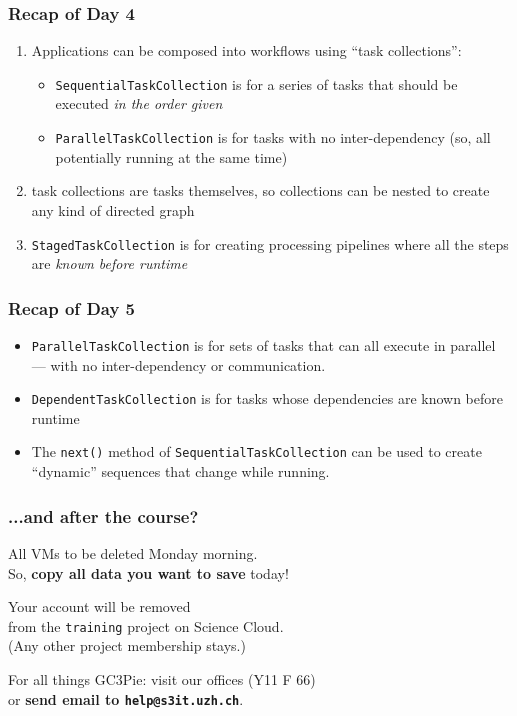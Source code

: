 \documentclass[english,serif,mathserif,xcolor=pdftex,dvipsnames,table]{beamer}
\begin{document}
\begin{frame}
  \frametitle{Recap of Day 4}

  \begin{enumerate}
  \item Applications can be composed into workflows using ``task collections'':
    \begin{itemize}
    \item \texttt{SequentialTaskCollection} is for a series of tasks that should
      be executed \emph{in the order given}
    \item \texttt{ParallelTaskCollection} is for tasks with no inter-dependency
      (so, all potentially running at the same time)
    \end{itemize}

  \item task collections are tasks themselves, so collections can be nested to
    create any kind of directed graph

  \item \texttt{StagedTaskCollection} is for creating processing pipelines where
    all the steps are \emph{known before runtime}
  \end{enumerate}
\end{frame}


\begin{frame}
  \frametitle{Recap of Day 5}

  \begin{itemize}
  \item \texttt{ParallelTaskCollection} is for sets of tasks that can all
    execute in parallel --- with no inter-dependency or communication.
  \item \texttt{DependentTaskCollection} is for tasks whose dependencies are
    known before runtime
  \item The \texttt{next()} method of \texttt{SequentialTaskCollection} can be
    used to create ``dynamic'' sequences that change while running.
  \end{itemize}

\end{frame}


\begin{frame}
  \frametitle{...and after the course?}
  \centering

  All VMs to be deleted Monday morning. \\
  So, \textbf{copy all data you want to save} today!

  \+
  Your account will be removed \\
  from the \texttt{training} project on Science Cloud. \\
  (Any other project membership stays.)

  \+
  For all things GC3Pie: visit our offices (Y11 F 66) \\
  or \textbf{send email to \texttt{help@s3it.uzh.ch}}.
\end{frame}
\end{document}
